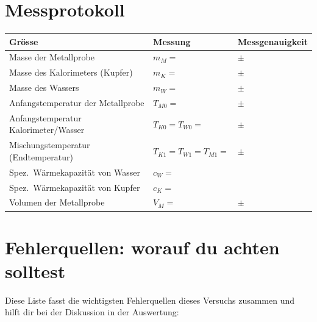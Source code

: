 \documentclass[11pt,a4paper]{article}
\newcommand{\Temp}{T}
\begin{document}
\section{Messprotokoll}
\renewcommand{\arraystretch}{1.6}
\begin{center}
\begin{tabularx}{\linewidth}{@{}X p{6.1cm} p{2.6cm}@{}}
  \toprule
  \textbf{Gr\"osse} & \textbf{Messung} & \textbf{Messgenauigkeit} \\
  \midrule
  Masse der Metallprobe & $m_M =$\dotfill & $\pm$\dotfill \\
  Masse des Kalorimeters (Kupfer) & $m_K =$\dotfill & $\pm$\dotfill \\
  Masse des Wassers & $m_W =$\dotfill & $\pm$\dotfill \\
  Anfangstemperatur der Metallprobe & $\Temp_{M0} =$\dotfill & $\pm$\dotfill \\
  Anfangstemperatur Kalorimeter/Wasser & $\Temp_{K0} = \Temp_{W0} =$\dotfill & $\pm$\dotfill \\
  Mischungstemperatur (Endtemperatur) & $\Temp_{K1} = \Temp_{W1} = \Temp_{M1} =$\dotfill & $\pm$\dotfill \\
  Spez.\ W\"armekapazit\"at von Wasser & $c_W =$\dotfill & \\
  Spez.\ W\"armekapazit\"at von Kupfer & $c_K =$\dotfill & \\
  Volumen der Metallprobe & $V_M =$\dotfill & $\pm$\dotfill \\
  \bottomrule
\end{tabularx}
\end{center}

\section{Fehlerquellen: worauf du achten solltest}
\label{sec:fehlerquellen}
Diese Liste fasst die wichtigsten Fehlerquellen dieses Versuchs zusammen und hilft dir bei der Diskussion in der Auswertung:
\end{document}
